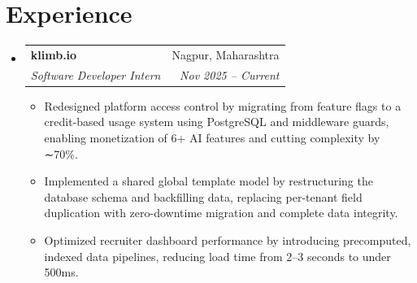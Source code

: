 \documentclass[letterpaper,10pt]{article}
\makeatletter
\newenvironment{resumeList}{
  \begin{itemize}[leftmargin=0.15in, label={}]
}{
  \end{itemize}
}
\newcommand{\resumeItem}[1]{
  \item\small{
    {#1 \vspace{-2.5pt}}
  }
}
\newcommand{\resumeSubheading}[4]{
  \vspace{-2pt}\item
    \begin{tabular*}{0.97\textwidth}[t]{l@{\extracolsep{\fill}}r}
      \textbf{#1} & #2 \\
      \textit{\small#3} & \textit{\small #4} \\
    \end{tabular*}\vspace{-6pt}
}
\newcommand{\resumeItemListStart}{\begin{itemize}[leftmargin=0.15in]}
\newcommand{\resumeItemListEnd}{\end{itemize}\vspace{-5pt}}
\makeatother
\begin{document}
\section{Experience}
\begin{resumeList}
    \resumeSubheading
    {klimb.io}{Nagpur, Maharashtra}
    {Software Developer Intern}{Nov 2025 – Current}
  \resumeItemListStart
    \resumeItem{Redesigned platform access control by migrating from feature flags to a credit-based usage system using PostgreSQL and middleware guards, enabling monetization of 6+ AI features and cutting complexity by ∼70\%.}
    \resumeItem{Implemented a shared global template model by restructuring the database schema and backfilling data, replacing per-tenant field duplication with zero-downtime migration and complete data integrity.}
    \resumeItem{Optimized recruiter dashboard performance by introducing precomputed, indexed data pipelines, reducing load time from 2–3 seconds to under 500ms.}
  \resumeItemListEnd
\end{resumeList}

\end{document}
